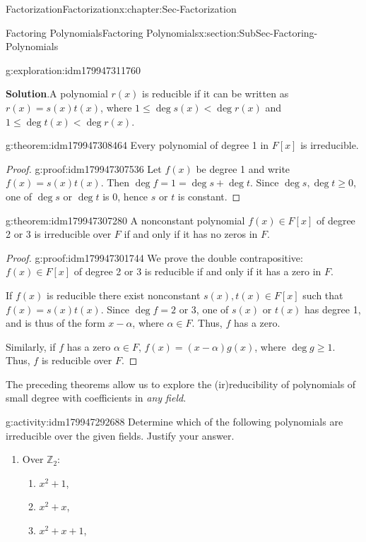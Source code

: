 \documentclass[oneside,10pt,]{book}
\newcommand{\blocktitlefont}{\relax}
\numberwithin{equation}{section}
\renewcommand{\le}{\leqslant}
\renewcommand{\ge}{\geqslant}
\def\Z{{\mathbb Z}}
\newcommand{\lt}{<}
\begin{document}
\begin{chapterptx}{Factorization}{}{Factorization}{}{}{x:chapter:Sec-Factorization}
\begin{sectionptx}{Factoring Polynomials}{}{Factoring Polynomials}{}{}{x:section:SubSec-Factoring-Polynomials}
\begin{exploration}{}{g:exploration:idm179947311760}
\par\smallskip%
\noindent\textbf{\blocktitlefont Solution}.\hypertarget{g:solution:idm179947310608}{}\quad{}A polynomial \(r(x)\) is reducible if it can be written as \(r(x) = s(x) t(x)\), where \(1 \le \deg s(x) \lt \deg r(x)\) and \(1 \le \deg t(x) \lt \deg r(x)\).%
\end{exploration}
\begin{theorem}{}{}{g:theorem:idm179947308464}%
Every polynomial of degree 1 in \(F[x]\) is irreducible.%
\end{theorem}
\begin{proof}{}{g:proof:idm179947307536}
Let \(f(x)\) be degree 1 and write \(f(x) = s(x) t(x)\). Then \(\deg f = 1 = \deg s + \deg t\). Since \(\deg s, \deg t \ge 0\), one of \(\deg s\) or \(\deg t\) is 0, hence \(s\) or \(t\) is constant.%
\end{proof}
\begin{theorem}{}{}{g:theorem:idm179947307280}%
A nonconstant polynomial \(f(x)\in F[x]\) of degree 2 or 3 is irreducible over \(F\) if and only if it has no zeros in \(F\).%
\end{theorem}
\begin{proof}{}{g:proof:idm179947301744}
We prove the double contrapositive: \(f(x)\in F[x]\) of degree 2 or 3 is reducible if and only if it has a zero in \(F\).%
\par
If \(f(x)\) is reducible there exist nonconstant \(s(x),t(x)\in F[x]\) such that \(f(x) = s(x) t(x)\). Since \(\deg f = 2\) or 3, one of \(s(x)\) or \(t(x)\) has degree 1, and is thus of the form \(x-\alpha\), where \(\alpha \in F\). Thus, \(f\) has a zero.%
\par
Similarly, if \(f\) has a zero \(\alpha\in F\), \(f(x) = (x-\alpha)g(x)\), where \(\deg g \ge 1\). Thus, \(f\) is reducible over \(F\).%
\end{proof}
The preceding theorems allow us to explore the (ir)reducibility of polynomials of small degree with coefficients in \emph{any field}.%
\begin{activity}{}{g:activity:idm179947292688}%
Determine which of the following polynomials are irreducible over the given fields. Justify your answer.%
%
\begin{enumerate}
\item{}Over \(\Z_2\):%
%
\begin{enumerate}
\item{}\(x^2 + 1\),%
\item{}\(x^2 + x\),%
\item{}\(x^2 +x +1\),%

\end{enumerate}
\end{enumerate}
\end{activity}
\end{sectionptx}
\end{chapterptx}
\end{document}

